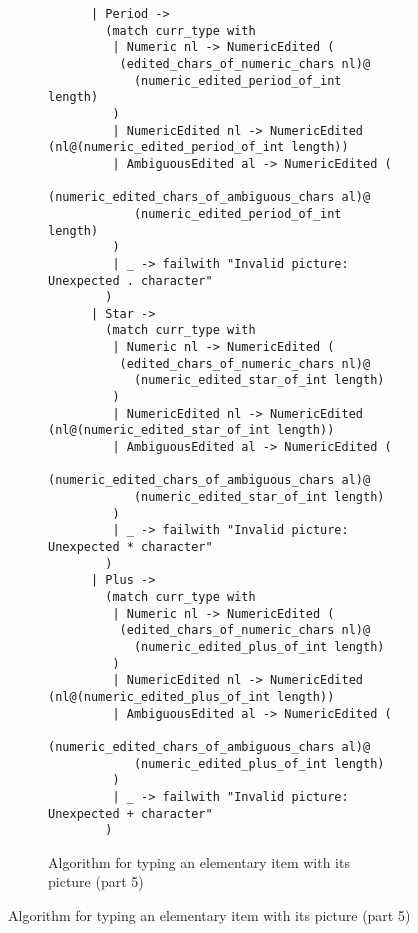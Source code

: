 \documentclass[a4paper,10pt]{article}
\begin{document}
\begin{figure}[!ht]
  \ContinuedFloat
  \begin{subfigure}{1.05\textwidth}
    \begin{verbatim}
      | Period ->
        (match curr_type with
         | Numeric nl -> NumericEdited (
          (edited_chars_of_numeric_chars nl)@
            (numeric_edited_period_of_int length)
         )
         | NumericEdited nl -> NumericEdited (nl@(numeric_edited_period_of_int length))
         | AmbiguousEdited al -> NumericEdited (
          (numeric_edited_chars_of_ambiguous_chars al)@
            (numeric_edited_period_of_int length)
         )
         | _ -> failwith "Invalid picture: Unexpected . character"
        )
      | Star ->
        (match curr_type with
         | Numeric nl -> NumericEdited (
          (edited_chars_of_numeric_chars nl)@
            (numeric_edited_star_of_int length)
         )
         | NumericEdited nl -> NumericEdited (nl@(numeric_edited_star_of_int length))
         | AmbiguousEdited al -> NumericEdited (
          (numeric_edited_chars_of_ambiguous_chars al)@
            (numeric_edited_star_of_int length)
         )
         | _ -> failwith "Invalid picture: Unexpected * character"
        )
      | Plus ->
        (match curr_type with
         | Numeric nl -> NumericEdited (
          (edited_chars_of_numeric_chars nl)@
            (numeric_edited_plus_of_int length)
         )
         | NumericEdited nl -> NumericEdited (nl@(numeric_edited_plus_of_int length))
         | AmbiguousEdited al -> NumericEdited (
          (numeric_edited_chars_of_ambiguous_chars al)@
            (numeric_edited_plus_of_int length)
         )
         | _ -> failwith "Invalid picture: Unexpected + character"
        )
    \end{verbatim}
    \caption{Algorithm for typing an elementary item with its picture (part 5)}
    \label{fig:algo_typ_elem_pic_5}
  \end{subfigure}
\end{figure}
\end{document}
